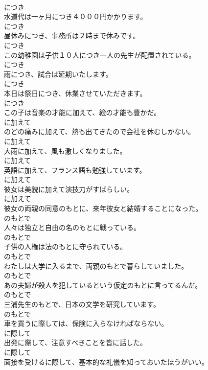 \documentclass[8pt]{extreport}
\begin{document}
\begin{CJK}{UTF8}{min}
\\	につき
\\	水道代は一ヶ月につき４０００円かかります。	
\\	につき
\\	昼休みにつき、事務所は２時まで休みです。	
\\	につき
\\	この幼稚園は子供１０人につき一人の先生が配置されている。	
\\	につき
\\	雨につき、試合は延期いたします。	
\\	につき
\\	本日は祭日につき、休業させていただきます。	
\\	につき
\\	この子は音楽の才能に加えて、絵の才能も豊かだ。	
\\	に加えて
\\	のどの痛みに加えて、熱も出てきたので会社を休むしかない。	
\\	に加えて
\\	大雨に加えて、風も激しくなりました。	
\\	に加えて
\\	英語に加えて、フランス語も勉強しています。	
\\	に加えて
\\	彼女は美貌に加えて演技力がすばらしい。	
\\	に加えて
\\	彼女の両親の同意のもとに、来年彼女と結婚することになった。	
\\	のもとで
\\	人々は独立と自由の名のもとに戦っている。	
\\	のもとで
\\	子供の人権は法のもとに守られている。	
\\	のもとで
\\	わたしは大学に入るまで、両親のもとで暮らしていました。	
\\	のもとで
\\	あの夫婦が殺人を犯しているという仮定のもとに言ってるんだ。	
\\	のもとで
\\	三浦先生のもとで、日本の文学を研究しています。	
\\	のもとで
\\	車を買うに際しては、保険に入らなければならない。	
\\	に際して
\\	出発に際して、注意すべきことを皆に話した。	
\\	に際して
\\	面接を受けるに際して、基本的な礼儀を知っておいたほうがいい。	

\end{CJK}
\end{document}

